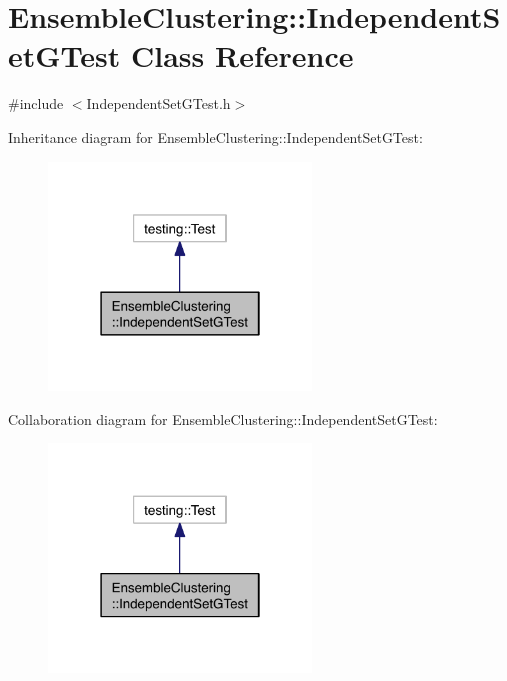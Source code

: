 \hypertarget{class_ensemble_clustering_1_1_independent_set_g_test}{\section{Ensemble\-Clustering\-:\-:Independent\-Set\-G\-Test Class Reference}
\label{class_ensemble_clustering_1_1_independent_set_g_test}
}


{\ttfamily \#include $<$Independent\-Set\-G\-Test.\-h$>$}



Inheritance diagram for Ensemble\-Clustering\-:\-:Independent\-Set\-G\-Test\-:
\nopagebreak
\begin{figure}[H]
\begin{center}
\leavevmode
\includegraphics[width=198pt]{class_ensemble_clustering_1_1_independent_set_g_test__inherit__graph}
\end{center}
\end{figure}


Collaboration diagram for Ensemble\-Clustering\-:\-:Independent\-Set\-G\-Test\-:
\nopagebreak
\begin{figure}[H]
\begin{center}
\leavevmode
\includegraphics[width=198pt]{class_ensemble_clustering_1_1_independent_set_g_test__coll__graph}
\end{center}
\end{figure}
